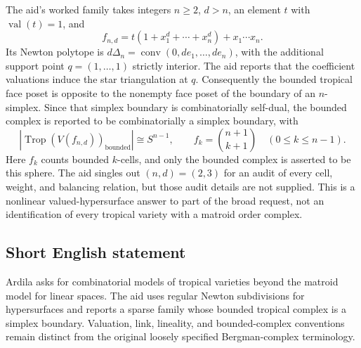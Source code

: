 \documentclass[11pt]{article}
\begin{document}
The aid's worked family takes integers \(n\ge2\), \(d>n\), an element \(t\) with \(\operatorname{val}(t)=1\), and
\[
 f_{n,d}=t(1+x_1^d+\cdots+x_n^d)+x_1\cdots x_n.
\]
Its Newton polytope is \(d\Delta_n=\operatorname{conv}(0,de_1,\ldots,de_n)\), with the additional support point \(q=(1,\ldots,1)\) strictly interior. The aid reports that the coefficient valuations induce the star triangulation at \(q\). Consequently the bounded tropical face poset is opposite to the nonempty face poset of the boundary of an \(n\)-simplex. Since that simplex boundary is combinatorially self-dual, the bounded complex is reported to be combinatorially a simplex boundary, with
\[
 |\operatorname{Trop}(V(f_{n,d}))_{\mathrm{bounded}}|\cong S^{n-1},\qquad
 f_k=\binom{n+1}{k+1}\quad(0\le k\le n-1).
\]
Here \(f_k\) counts bounded \(k\)-cells, and only the bounded complex is asserted to be this sphere. The aid singles out \((n,d)=(2,3)\) for an audit of every cell, weight, and balancing relation, but those audit details are not supplied. This is a nonlinear valued-hypersurface answer to part of the broad request, not an identification of every tropical variety with a matroid order complex.
\subsection{Short English statement}
Ardila asks for combinatorial models of tropical varieties beyond the matroid model for linear spaces. The aid uses regular Newton subdivisions for hypersurfaces and reports a sparse family whose bounded tropical complex is a simplex boundary. Valuation, link, lineality, and bounded-complex conventions remain distinct from the original loosely specified Bergman-complex terminology.
\end{document}
